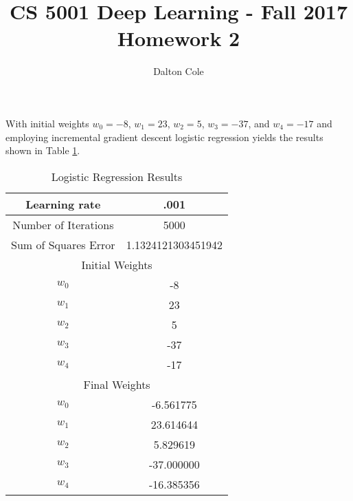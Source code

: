 \documentclass[times]{article}
\begin{document}
	\title{CS 5001 Deep Learning - Fall 2017 \\ Homework 2}
	\author{Dalton Cole}
	\date{}
	\maketitle

	With initial weights $w_0 = -8$, $w_1 = 23$, $w_2 = 5$, $w_3 = -37$, and $w_4 = -17$ and employing incremental gradient descent logistic regression yields the results shown in Table \ref{tab:results}.

	\begin{table}
		\centering
		\caption{Logistic Regression Results}
		\label{tab:results}
		\begin{tabular}{| c | c |}
			\hline
			Learning rate & .001 \\
			\hline
			Number of Iterations & 5000 \\
			\hline
			Sum of Squares Error & 1.1324121303451942 \\
			\hline
			\multicolumn{2}{|c|}{Initial Weights} \\
			\hline
			$w_0$ & -8 \\
			\hline
			$w_1$ & 23 \\
			\hline
			$w_2$ & 5 \\
			\hline
			$w_3$ & -37 \\
			\hline
			$w_4$ & -17 \\
			\hline
			\multicolumn{2}{|c|}{Final Weights} \\
			\hline
			$w_0$ & -6.561775 \\
			\hline
			$w_1$ & 23.614644 \\
			\hline
			$w_2$ & 5.829619 \\
			\hline
			$w_3$ & -37.000000 \\
			\hline
			$w_4$ & -16.385356 \\
			\hline
		\end{tabular}
	\end{table}
		
\end{document}
